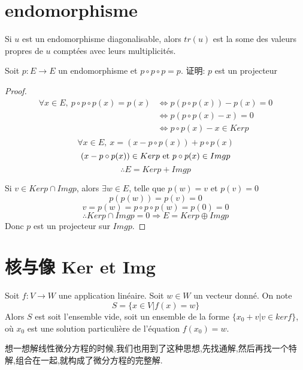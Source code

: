 \section{endomorphisme}
Si $u$ est un endomorphisme diagonalisable, alors $tr(u)$ est la some des valeurs propres de $u$ compt\'ees avec leurs multiplicit\'es.

\begin{example}
\end{example}
Soit $p: E \rightarrow E$ un endomorphisme et $p \circ p \circ p = p$.
证明: $p$ est un projecteur
\begin{proof}
$$
\begin{aligned}
\forall x \in E,~ p \circ p \circ p(x) = p(x)
& \Leftrightarrow p(p \circ p(x)) - p(x) = 0 \\
& \Leftrightarrow p(p \circ p(x) - x) = 0 \\
& \Leftrightarrow p \circ p(x) - x \in Ker p \\
\end{aligned}
$$
$$\forall x \in E,~ x = (x - p \circ p(x)) + p \circ p(x)$$
$$(x - p \circ p(x)) \in Ker p \textrm{\ et } p \circ p(x) \in Img p$$
$$\therefore E = Ker p + Img p$$

Si $v \in Ker p \cap Img p$, alors $\exists w \in E$, telle que $p(w) = v$ et $p(v) = 0$
$$p(p(w)) = p(v) = 0$$
$$v = p(w) = p \circ p \circ p(w) = p(0) = 0$$
$$\therefore Ker p \cap Img p = {0} \Rightarrow E = Ker p \oplus Img p$$
Donc $p$ est un projecteur sur $Img p$.
\end{proof}

\section{核与像 Ker et Img}
\begin{theorem}
Soit $f:V \rightarrow W$ une application lin\'eaire. Soit $w \in W$ un vecteur donn\'e. On note
$$ S=\{x \in V|f(x)=w\} $$
Alors $S$ est soit l'ensemble vide, soit un ensemble de la forme $\{x_0+v|v \in ker f\}$, o\`u $x_0$ est une solution particuli\`ere de l'\'equation $f(x_0)=w$.
\end{theorem}
\begin{note}
想一想解线性微分方程的时候,我们也用到了这种思想,先找通解,然后再找一个特解,组合在一起,就构成了微分方程的完整解.
\end{note}

